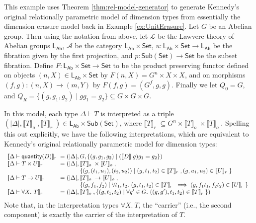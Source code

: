 \documentclass[a4paper,UKenglish]{lipics}
\newcommand{\msf}[1]{\mathsf{#1}} %
\newcommand{\Set}{\msf{Set}}
\newcommand{\Sub}[1]{\msf{Sub}(#1)}
\newcommand{\LAb}{\msf{L}_{\msf{Ab}}}
\newcommand{\A}{\mathcal{A}}
\newcommand{\sem}[1]{\ensuremath{\llbracket #1 \rrbracket} \;}
\newcommand{\semo}[1]{\ensuremath{\llbracket #1 \rrbracket _o} \;}
\newcommand{\semr}[1]{\ensuremath{\llbracket #1 \rrbracket _r} \;}
\newcommand{\qnt}{\msf{quantity}}
\begin{document}
\begin{example}\label{ex:relKen}
  This example uses Theorem \ref{thm:rel-model-generator} to generate
  Kennedy's original relationally parametric model of dimension types
  \cite{Kennedy:1997:RPU:263699.263761} from essentially the dimension
  erasure model back in Example \ref{ex:UnitErasure}. Let $G$ be an
  Abelian group. Then using the notation from above, let $\mathcal{L}$
  be the Lawvere theory of Abelian groups $\LAb$, $\A$ be the category
  $\LAb \times \Set$, $u: \LAb \times \Set \rightarrow \LAb$ be the
  fibration given by the first projection, and
  $p:\Sub{\Set}\rightarrow \Set$ be the subset fibration. Define
  $F:\LAb \times \Set \rightarrow \Set$ to be the product preserving
  functor defined on objects $(n,X) \in \LAb \times \Set$ by $F(n, X)
  = G^{n} \times X \times X$, and on morphisms $(f, g) : (n,X)
  \rightarrow (m, Y)$ by $F(f,g) = (G^f, g, g)$. Finally we let $Q_0 =
  G$, and $Q_R = \{(g,g_1,g_2) \mathrel| gg_1 = g_2 \} \subseteq G
  \times G \times G$.

  In this model, each type $\Delta \vdash T$ is interpreted as a
  triple $(|\Delta|, \semo{T}, \semr{T}) \in \LAb \times \Sub{\Set}$,
  where $\semr{T} \subseteq G^n \times \semo{T} \times
  \semo{T}$. Spelling this out explicitly, we have the following
  interpretations, which are equivalent to Kennedy's original
  relationally parametric model for dimension types:
  \begin{displaymath}
    \begin{array}{l@{\hspace{0.3em}}c@{\hspace{0.3em}}l}
      \semr{\Delta \vdash \qnt(D)} & = & (|\Delta|, G, \{ (g, g_1, g_2) \mathrel| (\sem{D}g)g_1 = g_2 \}) \\
      \semr{\Delta \vdash T \times U} & = &
      (|\Delta|,
      \begin{array}[t]{@{}l}
        \semo{T} \times \semo{U}, \\
        \{ (g, (t_1,u_1), (t_2,u_2)) \mathrel| (g,t_1,t_2) \in \semr{T}, (g,u_1,u_2) \in \semr{U} \}
      \end{array}
      \\
      \semr{\Delta \vdash T \to U} & = &
      (|\Delta|,
      \begin{array}[t]{@{}l}
        \semo{T} \to \semo{U}, \\
        \{ (g, f_1, f_2) \mathrel| \forall t_1, t_2.~(g,t_1,t_2) \in \semr{T} \implies (g,f_1t_1, f_2t_2) \in \semr{U} \}
      \end{array}
      \\
      \semr{\Delta \vdash \forall X.~T} & = & (|\Delta|,
      \begin{array}[t]{@{}l}
        \semo{T},
        \{ (g, t_1, t_2) \mathrel| \forall g' \in G.~((g,g'), t_1, t_2) \in \semr{T} \} )
      \end{array}
    \end{array}
  \end{displaymath}
  Note that, in the interpretation types $\forall X.~T$, the
  ``carrier'' (i.e., the second component) is exactly the carrier of
  the interpretation of $T$.
\end{example}
\end{document}

